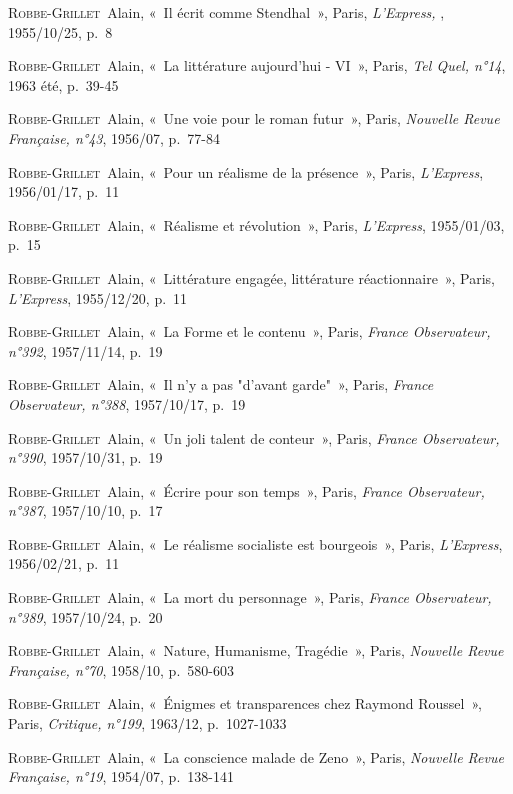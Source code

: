 \documentclass[12pt, a4paper]{article}
\begin{document}
        
        

        
        \textsc{Robbe-Grillet}~Alain, «~Il écrit comme Stendhal~», Paris, \textit{L'Express, }, 1955/10/25, p.~8\par
    \textsc{Robbe-Grillet}~Alain, «~La littérature aujourd'hui - VI~», Paris, \textit{Tel Quel, n°14}, 1963 été, p.~39-45\par
    \textsc{Robbe-Grillet}~Alain, «~Une voie pour le roman futur~», Paris, \textit{Nouvelle Revue Française, n°43}, 1956/07, p.~77-84\par
    \textsc{Robbe-Grillet}~Alain, «~Pour un réalisme de la présence~», Paris, \textit{L'Express}, 1956/01/17, p.~11\par
    \textsc{Robbe-Grillet}~Alain, «~Réalisme et révolution~», Paris, \textit{L'Express}, 1955/01/03, p.~15\par
    \textsc{Robbe-Grillet}~Alain, «~Littérature engagée, littérature réactionnaire~», Paris, \textit{L'Express}, 1955/12/20, p.~11\par
    \textsc{Robbe-Grillet}~Alain, «~La Forme et le contenu~», Paris, \textit{France Observateur, n°392}, 1957/11/14, p.~19\par
    \textsc{Robbe-Grillet}~Alain, «~Il n'y a pas "d'avant garde"~», Paris, \textit{France Observateur, n°388}, 1957/10/17, p.~19\par
    \textsc{Robbe-Grillet}~Alain, «~Un joli talent de conteur~», Paris, \textit{France Observateur, n°390}, 1957/10/31, p.~19\par
    \textsc{Robbe-Grillet}~Alain, «~Écrire pour son temps~», Paris, \textit{France Observateur, n°387}, 1957/10/10, p.~17\par
    \textsc{Robbe-Grillet}~Alain, «~Le réalisme socialiste est bourgeois~», Paris, \textit{L'Express}, 1956/02/21, p.~11\par
    \textsc{Robbe-Grillet}~Alain, «~La mort du personnage~», Paris, \textit{France Observateur, n°389}, 1957/10/24, p.~20\par
    \textsc{Robbe-Grillet}~Alain, «~Nature, Humanisme, Tragédie~», Paris, \textit{Nouvelle Revue Française, n°70}, 1958/10, p.~580-603\par
    \textsc{Robbe-Grillet}~Alain, «~Énigmes et transparences chez Raymond Roussel~», Paris, \textit{Critique, n°199}, 1963/12, p.~1027-1033\par
    \textsc{Robbe-Grillet}~Alain, «~La conscience malade de Zeno~», Paris, \textit{Nouvelle Revue Française, n°19}, 1954/07, p.~138-141\par
\end{document}
